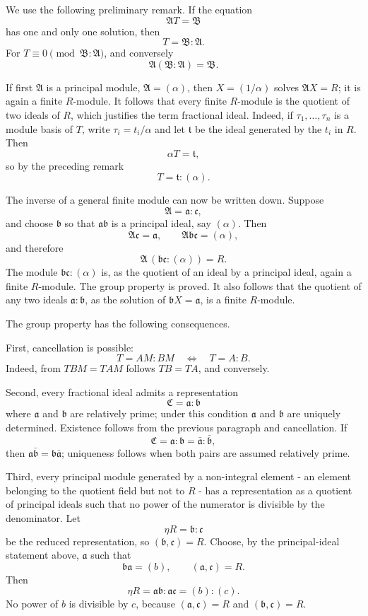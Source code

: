 \documentclass[11pt]{article}
\begin{document}
We use the following preliminary remark. If the equation \[
  \mathfrak A T=\mathfrak B
\] has one and only one solution, then \[
  T=\mathfrak B:\mathfrak A.
\] For \(T\equiv0\pmod{\mathfrak B:\mathfrak A}\), and conversely \[
  \mathfrak A(\mathfrak B:\mathfrak A)=\mathfrak B.
\]

If first \(\mathfrak A\) is a principal module,
\(\mathfrak A=(\alpha)\), then \(X=(1/\alpha)\) solves
\(\mathfrak A X=R\); it is again a finite \(R\)-module. It follows that
every finite \(R\)-module is the quotient of two ideals of \(R\), which
justifies the term fractional ideal. Indeed, if \(\tau_1,\ldots,\tau_n\)
is a module basis of \(T\), write \(\tau_i=t_i/\alpha\) and let
\(\mathfrak t\) be the ideal generated by the \(t_i\) in \(R\). Then \[
  \alpha T=\mathfrak t,
\] so by the preceding remark \[
  T=\mathfrak t:(\alpha).
\]

The inverse of a general finite module can now be written down. Suppose
\[
  \mathfrak A=\mathfrak a:\mathfrak c,
\] and choose \(\mathfrak b\) so that \(\mathfrak a\mathfrak b\) is a
principal ideal, say \((\alpha)\). Then \[
  \mathfrak A\mathfrak c=\mathfrak a,
  \qquad \mathfrak A\mathfrak b\mathfrak c=(\alpha),
\] and therefore \[
  \mathfrak A\, (\mathfrak b\mathfrak c:(\alpha))=R.
\] The module \(\mathfrak b\mathfrak c:(\alpha)\) is, as the quotient of
an ideal by a principal ideal, again a finite \(R\)-module. The group
property is proved. It also follows that the quotient of any two ideals
\(\mathfrak a:\mathfrak b\), as the solution of
\(\mathfrak bX=\mathfrak a\), is a finite \(R\)-module.

The group property has the following consequences.

First, cancellation is possible: \[
  T=AM:BM \quad\Longleftrightarrow\quad T=A:B.
\] Indeed, from \(TBM=TAM\) follows \(TB=TA\), and conversely.

Second, every fractional ideal admits a representation \[
  \mathfrak C=\mathfrak a:\mathfrak b
\] where \(\mathfrak a\) and \(\mathfrak b\) are relatively prime; under
this condition \(\mathfrak a\) and \(\mathfrak b\) are uniquely
determined. Existence follows from the previous paragraph and
cancellation. If \[
  \mathfrak C=\mathfrak a:\mathfrak b=\bar{\mathfrak a}:\bar{\mathfrak b},
\] then \(\mathfrak a\bar{\mathfrak b}=\mathfrak b\bar{\mathfrak a}\);
uniqueness follows when both pairs are assumed relatively prime.

Third, every principal module generated by a non-integral element - an
element belonging to the quotient field but not to \(R\) - has a
representation as a quotient of principal ideals such that no power of
the numerator is divisible by the denominator. Let \[
  \eta R=\mathfrak b:\mathfrak c
\] be the reduced representation, so \((\mathfrak b,\mathfrak c)=R\).
Choose, by the principal-ideal statement above, \(\mathfrak a\) such
that \[
  \mathfrak b\mathfrak a=(b),
  \qquad (\mathfrak a,\mathfrak c)=R.
\] Then \[
  \eta R=\mathfrak a\mathfrak b:\mathfrak a\mathfrak c=(b):(c).
\] No power of \(b\) is divisible by \(c\), because
\((\mathfrak a,\mathfrak c)=R\) and \((\mathfrak b,\mathfrak c)=R\).
\end{document}
